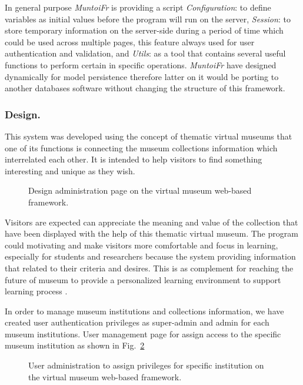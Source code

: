 In general purpose \textit{MuntoiFr} is providing a script \textit{Configuration}: to define variables as initial values before the program will run on the server, \textit{Session}: to store temporary information on the server-side during a period of time which could be used across multiple pages, this feature always used for user authentication and validation, and \textit{Utils}: as a tool that contains several useful functions to perform certain in specific operations. \textit{MuntoiFr} have designed dynamically for model persistence therefore latter on it would be porting to another databases software without changing the structure of this framework.

\subsubsection{Design.} This system was developed using the concept of thematic virtual museums that one of its functions is connecting the museum collections information which interrelated each other. It is intended to help visitors to find something interesting and unique as they wish.

\begin{figure}[ht]
	\caption{Design administration page on the virtual museum web-based framework.}\label{fig:designAdminPage}
\end{figure}

Visitors are expected can appreciate the meaning and value of the collection that have been displayed with the help of this thematic virtual museum. The program could motivating and make visitors more comfortable and focus in learning, especially for students and researchers because the system providing information that related to their criteria and desires. This is as complement for reaching the future of museum to provide a personalized learning environment to support learning process \cite{Anggai}.

In order to manage museum institutions and collections information, we have created user authentication privileges as super-admin and admin for each museum institutions. User management page for assign access to the specific museum institution as shown in Fig.~\cref{fig:userAdminPage}

\begin{figure}[ht]
	\caption{User administration to assign privileges for specific institution on the virtual museum web-based framework.}\label{fig:userAdminPage}
\end{figure}

